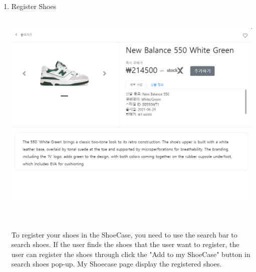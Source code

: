 \documentclass[conference]{IEEEtran}
\begin{document}
\begin{enumerate}
	\item Register Shoes\\\\
\centerline{\includegraphics[scale=0.35]{pics/shoes_register.png}}
\\\\To register your shoes in the ShoeCase, you need to use the search bar to search shoes. If the user finds the shoes that the user want to register, the user can register the shoes through click the "Add to my ShoeCase" button in search shoes pop-up. My Shoecase page display the registered shoes.\\\\
	

\end{enumerate}
\end{document}
